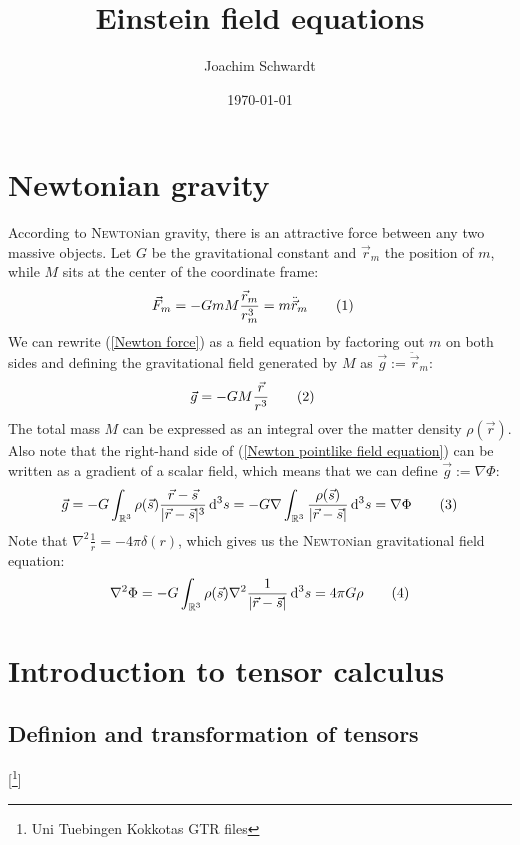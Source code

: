 \documentclass[a4paper,12pt]{article}
\newcommand\numberthis{\addtocounter{equation}{1}\tag{\theequation}}
\newcommand{\intr}{}
\begin{document}
\title{Einstein field equations}
\author{Joachim Schwardt}
\date{\today}
\maketitle

\section{Newtonian gravity}
According to \textsc{Newton}ian gravity, there is an attractive force between any two massive objects. Let $G$ be the gravitational constant and $\vec{r}_m$ the position of $m$, while $M$ sits at the center of the coordinate frame:
\begin{align*}
\vec{F}_m&=-GmM\frac{\vec{r}_m}{r_m^3}=m\ddot{\vec{r}}_m\numberthis\label{Newton force}
\end{align*}
We can rewrite (\ref{Newton force}) as a field equation by factoring out $m$ on both sides and defining the gravitational field generated by $M$ as $\vec{g}:=\ddot{\vec{r}}_m$:
\begin{align*}
\vec{g}&=-GM\frac{\vec{r}}{r^3}\numberthis\label{Newton pointlike field equation}
\end{align*}
The total mass $M$ can be expressed as an integral over the matter density $\rho(\vec{r})$. Also note that the right-hand side of (\ref{Newton pointlike field equation}) can be written as a gradient of a scalar field, which means that we can define $\vec{g}:=\nabla\Phi$:
\begin{align*}
\vec{g}=-G\intr\int_{\mathbb{R}^{3}}{\rho(\vec{s})\frac{\vec{r}-\vec{s}}{|\vec{r}-\vec{s}|^3}}\,\mathrm{d}^{3}s=-G\nabla\intr\int_{\mathbb{R}^{3}}{\frac{\rho(\vec{s})}{|\vec{r}-\vec{s}|}}\,\mathrm{d}^{3}s=\nabla\Phi \numberthis\label{Newton integral representation}
\end{align*}
Note that $\nabla^2\frac{1}{r}=-4\pi\delta(r)$, which gives us the \textsc{Newton}ian gravitational field equation:
\begin{align*}
\nabla^2\Phi=-G\intr\int_{\mathbb{R}^{3}}{\rho(\vec{s})\nabla^2\frac{1}{|\vec{r}-\vec{s}|}}\,\mathrm{d}^{3}s=4\pi G\rho\numberthis\label{Newton field equation}
\end{align*}
\section{Introduction to tensor calculus}
\subsection{Definion and transformation of tensors}[\footnote{Uni Tuebingen Kokkotas GTR files}]
\end{document}
